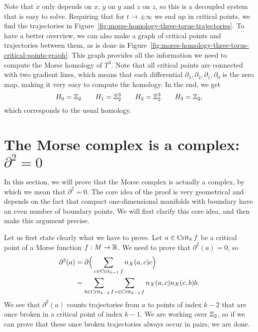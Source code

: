 \begin{eg}
    Note that $\dot x$ only depends on  $x$,  $\dot y$ on  $y$ and  $\dot z$ on $z$, so this is a decoupled system that is easy to solve.
    Requiring that for $t \to  \pm\infty$ we end up in critical points, we find the trajectories in Figure~\ref{fig:morse-homology-three-torus-trajectories}.
    To have a better overview, we can also make a graph of critical points and trajectories between them, as is done in Figure~\ref{fig:mores-homology-three-torus-critical-points-graph}.
    This graph provides all the information we need to compute the Morse homology of $T^{3}$.
    Note that all critical points are connected with two gradient lines, which means that each differential $\partial_3, \partial_{2}, \partial_1, \partial_0$ is the zero map, making it very easy to compute the homology. In the end, we get
    \[
    H_0 = \mathbb{Z}_2 \qquad 
    H_1 = \mathbb{Z}_2^3 \qquad 
    H_2 = \mathbb{Z}_2^3 \qquad 
    H_3 = \mathbb{Z}_2
    ,\] 
    which corresponds to the usual homology.
\end{eg}

\section{The Morse complex is a complex: $\partial^2 = 0$}
In this section, we will prove that the Morse complex is actually a complex, by which we mean that $\partial^2 = 0$.
The core idea of the proof is very geometrical and depends on the fact that compact one-dimensional manifolds with boundary have an even number of boundary points.
We will first clarify this core idea, and then make this argument precise.

Let us first state clearly what we have to prove. Let $a \in \operatorname{Crit}_k f$ be a critical point of a Morse function $f: M \to  \mathbb{R}$.
We need to prove that $\partial^2(a) = 0$, so\begin{align*}
    \partial^2(a) &= \partial \Big(\sum_{c \in \operatorname{Crit}_{k-1} f} n_X(a, c) c\Big)\\
                  &= \sum_{b \in \operatorname{Crit}_{k-2} f} \sum_{c \in \operatorname{Crit}_{k-1} f} n_X(a, c) n_X(c, b) b
.\end{align*} 
We see that $\partial^2(a)$ counts trajectories from $a$ to points of index $k-2$ that are once broken in a critical point of index $k-1$.
We are working over $\mathbb{Z}_2$, so if we can prove that these once broken trajectories always occur in pairs, we are done.

